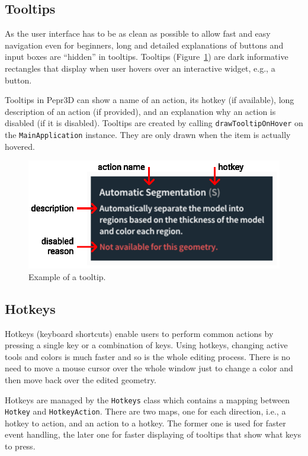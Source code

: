 \subsection{Tooltips}

As the user interface has to be as clean as possible to allow fast and easy navigation even for beginners, long and detailed explanations of buttons and input boxes are ``hidden'' in tooltips.
Tooltips (Figure~\ref{fig:tooltip}) are dark informative rectangles that display when user hovers over an interactive widget, e.g., a button.

Tooltips in Pepr3D can show a name of an action, its hotkey (if available), long description of an action (if provided), and an explanation why an action is disabled (if it is disabled).
Tooltips are created by calling \texttt{drawTooltipOnHover} on the \texttt{MainApplication} instance.
They are only drawn when the item is actually hovered.

\begin{figure}[h]
	\centering
	\centerline{\includegraphics[scale=1.0]{images/tooltip.eps}}
	\caption{Example of a tooltip.}
	\label{fig:tooltip}
\end{figure}

\subsection{Hotkeys}

Hotkeys (keyboard shortcuts) enable users to perform common actions by pressing a single key or a combination of keys.
Using hotkeys, changing active tools and colors is much faster and so is the whole editing process.
There is no need to move a mouse cursor over the whole window just to change a color and then move back over the edited geometry.

Hotkeys are managed by the \texttt{Hotkeys} class which contains a mapping between \texttt{Hotkey} and \texttt{HotkeyAction}.
There are two maps, one for each direction, i.e., a hotkey to action, and an action to a hotkey.
The former one is used for faster event handling, the later one for faster displaying of tooltips that show what keys to press.

